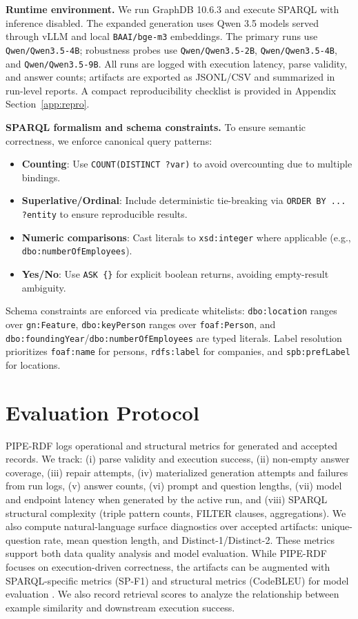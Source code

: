 \documentclass[11pt]{article}
\begin{document}
\textbf{Runtime environment.} We run GraphDB 10.6.3 and execute SPARQL with inference disabled. The expanded generation uses Qwen 3.5 models served through vLLM and local \texttt{BAAI/bge-m3} embeddings. The primary runs use \texttt{Qwen/Qwen3.5-4B}; robustness probes use \texttt{Qwen/Qwen3.5-2B}, \texttt{Qwen/Qwen3.5-4B}, and \texttt{Qwen/Qwen3.5-9B}. All runs are logged with execution latency, parse validity, and answer counts; artifacts are exported as JSONL/CSV and summarized in run-level reports. A compact reproducibility checklist is provided in Appendix Section~\ref{app:repro}.

\textbf{SPARQL formalism and schema constraints.} To ensure semantic correctness, we enforce canonical query patterns:
\begin{itemize}
  \item \textbf{Counting}: Use \texttt{COUNT(DISTINCT ?var)} to avoid overcounting due to multiple bindings.
  \item \textbf{Superlative/Ordinal}: Include deterministic tie-breaking via \texttt{ORDER BY ... ?entity} to ensure reproducible results.
  \item \textbf{Numeric comparisons}: Cast literals to \texttt{xsd:integer} where applicable (e.g., \texttt{dbo:numberOfEmployees}).
  \item \textbf{Yes/No}: Use \texttt{ASK \{\}} for explicit boolean returns, avoiding empty-result ambiguity.
\end{itemize}
Schema constraints are enforced via predicate whitelists: \texttt{dbo:location} ranges over \texttt{gn:Feature}, \texttt{dbo:keyPerson} ranges over \texttt{foaf:Person}, and \texttt{dbo:foundingYear}/\texttt{dbo:numberOfEmployees} are typed literals. Label resolution prioritizes \texttt{foaf:name} for persons, \texttt{rdfs:label} for companies, and \texttt{spb:prefLabel} for locations.

\section{Evaluation Protocol}
PIPE-RDF logs operational and structural metrics for generated and accepted records. We track: (i) parse validity and execution success, (ii) non-empty answer coverage, (iii) repair attempts, (iv) materialized generation attempts and failures from run logs, (v) answer counts, (vi) prompt and question lengths, (vii) model and endpoint latency when generated by the active run, and (viii) SPARQL structural complexity (triple pattern counts, FILTER clauses, aggregations). We also compute natural-language surface diagnostics over accepted artifacts: unique-question rate, mean question length, and Distinct-1/Distinct-2. These metrics support both data quality analysis and model evaluation. While PIPE-RDF focuses on execution-driven correctness, the artifacts can be augmented with SPARQL-specific metrics (SP-F1) and structural metrics (CodeBLEU) for model evaluation \citep{Rony_2022,ren2020codebleumethodautomaticevaluation}. We also record retrieval scores to analyze the relationship between example similarity and downstream execution success.
\end{document}
